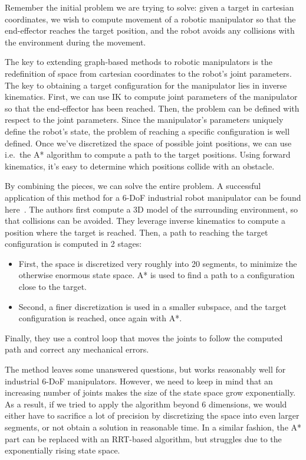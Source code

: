 Remember the initial problem we are trying to solve: given a target in cartesian coordinates, we wish to compute movement of a robotic manipulator so that the end-effector reaches the target position, and the robot avoids any collisions with the environment during the movement.

The key to extending graph-based methods to robotic manipulators is the redefinition of space from cartesian coordinates to the robot's joint parameters. The key to obtaining a target configuration for the manipulator lies in inverse kinematics. First, we can use IK to compute joint parameters of the manipulator so that the end-effector has been reached. Then, the problem can be defined with respect to the joint parameters.
Since the manipulator's parameters uniquely define the robot's state, the problem of reaching a specific configuration is well defined. Once we've discretized the space of possible joint positions, we can use i.e.\ the A* algorithm to compute a path to the target positions. Using forward kinematics, it's easy to determine which positions collide with an obstacle.

By combining the pieces, we can solve the entire problem. A successful application of this method for a 6-DoF industrial robot manipulator can be found here~\cite{doubleA_star}. The authors first compute a 3D model of the surrounding environment, so that collisions can be avoided. They leverage inverse kinematics to compute a position where the target is reached. Then, a path to reaching the target configuration is computed in 2 stages:

\begin{itemize}
\item First, the space is discretized very roughly into 20 segments, to minimize the otherwise enormous state space. A* is used to find a path to a configuration close to the target.
\item Second, a finer discretization is used in a smaller subspace, and the target configuration is reached, once again with A*.
\end{itemize}

Finally, they use a control loop that moves the joints to follow the computed path and correct any mechanical errors.

The method leaves some unanswered questions, but works reasonably well for industrial 6-DoF manipulators. However, we need to keep in mind that an increasing number of joints makes the size of the state space grow exponentially. As a result, if we tried to apply the algorithm beyond 6 dimensions, we would either have to sacrifice a lot of precision by discretizing the space into even larger segments, or not obtain a solution in reasonable time. In a similar fashion, the A* part can be replaced with an RRT-based algorithm, but struggles due to the exponentially rising state space.

